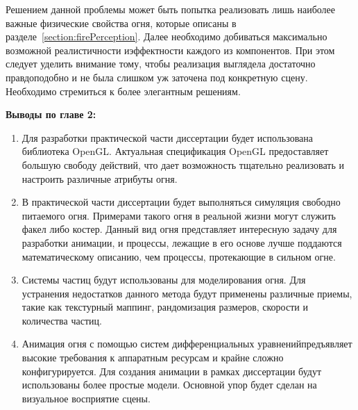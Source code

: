 Решением данной проблемы может быть попытка реализовать лишь наиболее важные
физические свойства огня, которые описаны в
разделе~\ref{section:firePerception}. Далее необходимо добиваться максимально
возможной реалистичности и\break{}эффектности каждого из компонентов. При этом
следует уделить внимание тому, чтобы реализация выглядела достаточно
правдоподобно и не была слишком уж заточена под конкретную сцену. Необходимо
стремиться к более элегантным решениям.

\textbf{Выводы по главе 2:}
\begin{enumerate}
    \item Для разработки практической части диссертации будет использована
        библиотека OpenGL\@. Актуальная спецификация OpenGL предоставляет большую
        свободу действий, что дает возможность тщательно реализовать и настроить
        различные атрибуты огня.
    \item В практической части диссертации будет выполняться симуляция свободно
        питаемого огня. Примерами такого огня в реальной жизни могут служить
        факел либо костер. Данный вид огня представляет интересную задачу для
        разработки анимации, и процессы, лежащие в его основе лучше поддаются
        математическому описанию, чем процессы, протекающие в сильном огне.
    \item Системы частиц будут использованы для моделирования огня. Для
        устранения недостатков данного метода будут применены различные приемы,
        такие как текстурный маппинг, рандомизация размеров, скорости и
        количества частиц.
    \item Анимация огня с помощью систем дифференциальных
        уравнений\break{}предъявляет высокие требования к аппаратным ресурсам и
        крайне сложно конфигурируется. Для создания анимации в рамках
        диссертации будут использованы более простые модели. Основной упор будет
        сделан на визуальное восприятие сцены.
\end{enumerate}
